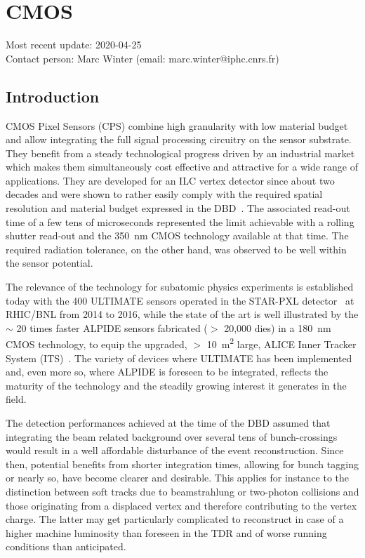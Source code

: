 \section{CMOS}
Most recent update: 2020-04-25 \\
Contact person: Marc Winter (email: marc.winter@iphc.cnrs.fr)

\subsection{Introduction}
CMOS Pixel Sensors (CPS) combine high granularity with low material
budget and allow integrating the full signal processing circuitry on
the sensor substrate. They benefit from a steady technological progress 
driven by an industrial market which makes them simultaneously cost 
effective and attractive for a wide range of applications. They are 
developed for an ILC vertex detector since about two decades and were 
shown to rather easily comply with the required spatial resolution 
and material budget expressed in the DBD~\cite{Behnke:2013lya}. The
associated read-out time of a few tens of microseconds represented the
limit achievable with a rolling shutter read-out and the \SI{350}{\nano\meter} CMOS 
technology available at that time. The required radiation tolerance, 
on the other hand, was observed to be well within the sensor potential.
 
The relevance of the technology for subatomic physics experiments is established today with the 400 ULTIMATE sensors operated in the STAR-PXL 
detector~\cite{CONTIN201860} at RHIC/BNL from 2014 to 2016, while the
state of the art is well illustrated by the $\sim$ 20 times faster ALPIDE sensors fabricated ($>$ 20,000 dies) in a \SI{180}{\nano\meter} CMOS technology, to 
equip the upgraded, $>$ \SI{10}{\meter\squared} large, ALICE Inner Tracker System 
(ITS)~\cite{AGLIERIRINELLA2017583}. 
The variety of devices where ULTIMATE has been implemented and, even 
more so, where ALPIDE is foreseen to be integrated, reflects the maturity 
of the technology and the steadily growing interest it generates in the
field.
 
  The detection performances achieved at the time of the DBD 
assumed that integrating the beam related background over several tens 
of bunch-crossings would result in a well affordable disturbance of the 
event reconstruction. Since then, 
potential benefits from shorter integration times, allowing for bunch 
tagging or nearly so, have become clearer and desirable. This applies 
for instance to the distinction between soft tracks due to beamstrahlung
or two-photon collisions and those originating from a displaced vertex
and therefore contributing to the vertex charge. The latter may get  
particularly complicated to reconstruct in case of a higher machine 
luminosity than foreseen in the TDR and of worse running conditions 
than anticipated. 
  
